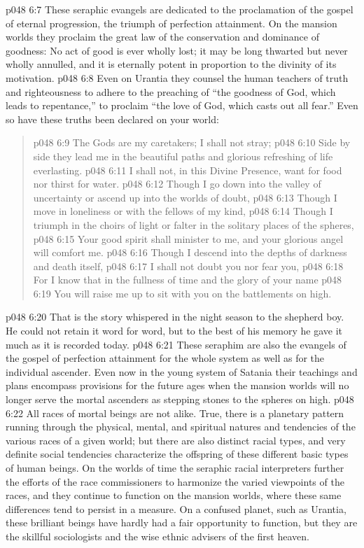 \vs p048 6:7 \pc These seraphic evangels are dedicated to the proclamation of the gospel of eternal progression, the triumph of perfection attainment. On the mansion worlds they proclaim the great law of the conservation and dominance of goodness: No act of good is ever wholly lost; it may be long thwarted but never wholly annulled, and it is eternally potent in proportion to the divinity of its motivation.
\vs p048 6:8 Even on Urantia they counsel the human teachers of truth and righteousness to adhere to the preaching of “the goodness of God, which leads to repentance,” to proclaim “the love of God, which casts out all fear.” Even so have these truths been declared on your world:
\begin{quote}
\vs p048 6:9 The Gods are my caretakers; I shall not stray;
\vs p048 6:10 Side by side they lead me in the beautiful paths and glorious refreshing of life everlasting.
\vs p048 6:11 I shall not, in this Divine Presence, want for food nor thirst for water.
\vs p048 6:12 Though I go down into the valley of uncertainty or ascend up into the worlds of doubt,
\vs p048 6:13 Though I move in loneliness or with the fellows of my kind,
\vs p048 6:14 Though I triumph in the choirs of light or falter in the solitary places of the spheres,
\vs p048 6:15 Your good spirit shall minister to me, and your glorious angel will comfort me.
\vs p048 6:16 Though I descend into the depths of darkness and death itself,
\vs p048 6:17 I shall not doubt you nor fear you,
\vs p048 6:18 For I know that in the fullness of time and the glory of your name
\vs p048 6:19 You will raise me up to sit with you on the battlements on high.
\end{quote}
\vs p048 6:20 \pc That is the story whispered in the night season to the shepherd boy. He could not retain it word for word, but to the best of his memory he gave it much as it is recorded today.
\vs p048 6:21 These seraphim are also the evangels of the gospel of perfection attainment for the whole system as well as for the individual ascender. Even now in the young system of Satania their teachings and plans encompass provisions for the future ages when the mansion worlds will no longer serve the mortal ascenders as stepping stones to the spheres on high.
\vs p048 6:22 \bibnobreakspace {} All races of mortal beings are not alike. True, there is a planetary pattern running through the physical, mental, and spiritual natures and tendencies of the various races of a given world; but there are also distinct racial types, and very definite social tendencies characterize the offspring of these different basic types of human beings. On the worlds of time the seraphic racial interpreters further the efforts of the race commissioners to harmonize the varied viewpoints of the races, and they continue to function on the mansion worlds, where these same differences tend to persist in a measure. On a confused planet, such as Urantia, these brilliant beings have hardly had a fair opportunity to function, but they are the skillful sociologists and the wise ethnic advisers of the first heaven.
